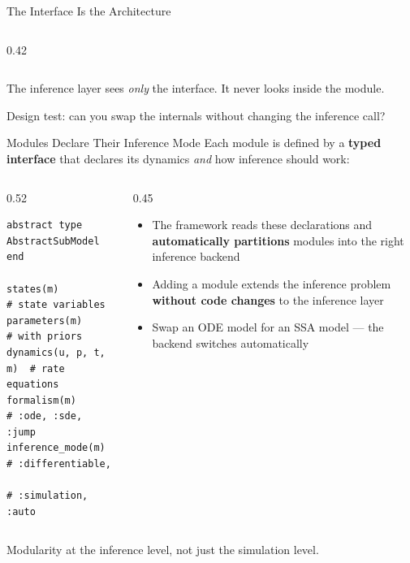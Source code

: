 \documentclass[aspectratio=169]{beamer}
\begin{document}
\begin{frame}{The Interface Is the Architecture}
\begin{columns}[T]
\begin{column}{0.42\textwidth}
		\end{column}
	\end{columns}
\vspace{1mm}
The inference layer sees \emph{only} the interface. It never looks inside the module.


	\alert{Design test: can you swap the internals without changing the inference call?}
\end{frame}

\begin{frame}[fragile]{Modules Declare Their Inference Mode}
	Each module is defined by a \textbf{typed interface} that declares its dynamics \emph{and} how inference should work:

	\bigskip
	\begin{columns}[T]
		\begin{column}{0.52\textwidth}
			\begin{lstlisting}[style=julia]
abstract type AbstractSubModel end

states(m)          # state variables
parameters(m)      # with priors
dynamics(u, p, t, m)  # rate equations
formalism(m)       # :ode, :sde, :jump
inference_mode(m)  # :differentiable,
                   # :simulation, :auto
			\end{lstlisting}
		\end{column}
		\begin{column}{0.45\textwidth}
			\begin{itemize}\itemsep6pt
				\item The framework reads these declarations and \textbf{automatically partitions} modules into the right inference backend
				\item Adding a module extends the inference problem \textbf{without code changes} to the inference layer
				\item Swap an ODE model for an SSA model --- the backend switches automatically
			\end{itemize}
		\end{column}
	\end{columns}

	\vfill
	\centering
	\alert{Modularity at the inference level, not just the simulation level.}
\end{frame}
\end{document}
